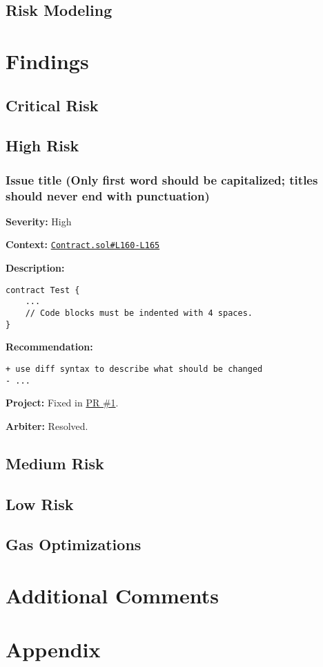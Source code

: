 \subsection{Risk Modeling}\label{risk-modeling}
\section{Findings}\label{findings}
\subsection{Critical Risk}\label{critical-risk}
\subsection{High Risk}\label{high-risk}
\subsubsection{Issue title (Only first word should be capitalized;
titles should never end with
punctuation)}\label{issue-title-only-first-word-should-be-capitalized-titles-should-never-end-with-punctuation}

\textbf{Severity:} High

\textbf{Context:}
\href{https://github.com/actuallink}{\texttt{Contract.sol\#L160-L165}}

\textbf{Description:}

\begin{verbatim}
contract Test {
    ...
    // Code blocks must be indented with 4 spaces.
}
\end{verbatim}

\textbf{Recommendation:}

\begin{verbatim}
+ use diff syntax to describe what should be changed
- ...
\end{verbatim}

\textbf{Project:} Fixed in \href{Https://github.com/actuallink}{PR \#1}.

\textbf{Arbiter:} Resolved.

\subsection{Medium Risk}\label{medium-risk}

\subsection{Low Risk}\label{low-risk}

\subsection{Gas Optimizations}\label{gas-optimizations}

\section{Additional Comments}\label{additional-comments}

\section{Appendix}\label{appendix}
